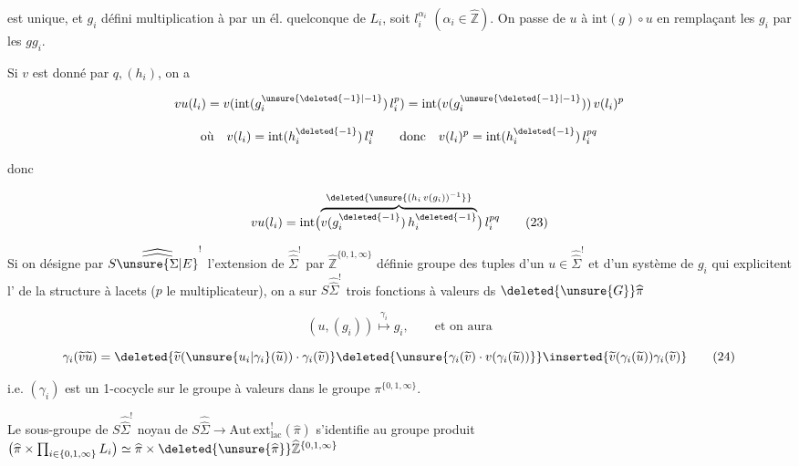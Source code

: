 est unique, et $g_i$ défini multiplication à  par un él. quelconque de $L_i$, soit $l_i^{\alpha_i}$ $(\alpha_i\in\widehat{\mathbb Z})$. On passe de $u$ à $\mathrm{int}(g)\circ u$ en  remplaçant les $g_i$ par les $gg_i$.

Si $v$ est donné par $q,(h_i)$, on a

\[
vu(l_i)=v(\mathrm{int}(g_i^{\unsure{\deleted{-1}|-1}})\,l_i^p)=\mathrm{int}(v(g_i^{\unsure{\deleted{-1}|-1}}))\,v(l_i)^p
\]

\[
\text{où}\quad v(l_i)=\mathrm{int}(h_i^{\deleted{-1}})\,l_i^q\qquad\text{donc}\quad
v(l_i)^p=\mathrm{int}(h_i^{\deleted{-1}})\,l_i^{pq}
\]

donc

\[
vu(l_i)=\mathrm{int}\bigl(\overbrace{v(g_i^{\deleted{-1}})\,h_i^{\deleted{-1}}}^{\deleted{\unsure{(h_i\,v(g_i))^{-1}}}}\bigr)\,l_i^{pq} \tag*{(23)}
\]

Si on désigne par $S\widehat{\widehat{\unsure{\Sigma|E}}}^{!}$ l'extension de $\widehat{\widehat\Sigma}^{!}$ par $\widehat{\mathbb Z}^{\{0,1,\infty\}}$ définie  groupe des  tuples d'un $u\in\widehat{\widehat\Sigma}^{!}$ et d'un système de $g_i$ qui explicitent  l' de la structure à lacets ($p$  le multiplicateur), on a sur $S\widehat{\widehat\Sigma}^{!}$ trois fonctions à valeurs ds $\deleted{\unsure{G}}\widehat\pi$


\[
(u,(g_i))\overset{\gamma_i}{\longmapsto}g_i,\qquad\text{et on aura}
\]

\[
\gamma_i(\widetilde v\widetilde u)=
\deleted{\widetilde v(\unsure{u_i|\gamma_i}(\widetilde u))\cdot\gamma_i(\widetilde v)}
\deleted{\unsure{\gamma_i(\widetilde v)\cdot v(\gamma_i(\widetilde u))}}
\inserted{\widetilde v(\gamma_i(\widetilde u))\gamma_i(\widetilde v)} \tag*{(24)}
\]

i.e. $(\gamma_i)$ est un 1-cocycle sur le groupe   à valeurs dans le groupe   $\pi^{\{0,1,\infty\}}$.

 Le sous-groupe de $S\widehat{\widehat\Sigma}^{!}$ noyau de $S\widehat{\widehat\Sigma}\longrightarrow\mathrm{Aut\,ext}_{\mathrm{lac}}^{!}(\widehat\pi)$  s'identifie au groupe produit $\bigl(\widehat\pi\times\prod_{i\in\{0,1,\infty\}}L_i\bigr)\simeq\widehat\pi\times\deleted{\unsure{\widehat\pi}}\widehat{\mathbb Z}^{\{0,1,\infty\}}$

